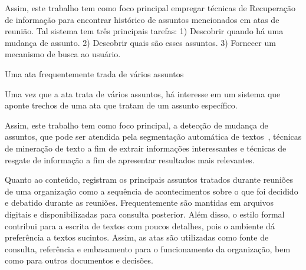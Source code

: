 







Assim, este trabalho tem como foco principal empregar técnicas de Recuperação de informação para encontrar histórico de assuntos mencionados em atas de reunião. Tal sistema tem três principais tarefas: 
1) Descobrir quando há uma mudança de assunto. 
2) Descobrir quais são esses assuntos. 
3) Fornecer um mecanismo de busca ao usuário. 



Uma ata frequentemente trada de vários assuntos

Uma vez que a ata trata de vários assuntos, 
há interesse em um sistema que aponte trechos de uma ata que tratam de um assunto específico. 

Assim, este trabalho tem como foco principal, a detecção de mudança de assuntos, que pode ser atendida pela segmentação automática de textos~\cite{Chen2017,Naili2016,Cardoso2017}, técnicas de mineração de texto a fim de extrair informações interessantes e técnicas de resgate de informação a fim de apresentar resultados mais relevantes. 



Quanto ao conteúdo, registram os principais assuntos tratados durante reuniões de uma organização como a sequência de acontecimentos sobre o que foi decidido e debatido durante as reuniões. Frequentemente são mantidas em arquivos digitais e disponibilizadas para consulta posterior.  Além disso, o estilo formal contribui para a escrita de textos com poucos detalhes, pois o ambiente dá preferência a textos sucintos.  Assim, as atas são utilizadas como fonte de consulta, referência e embasamento para o funcionamento da organização, bem como para outros documentos e decisões.



